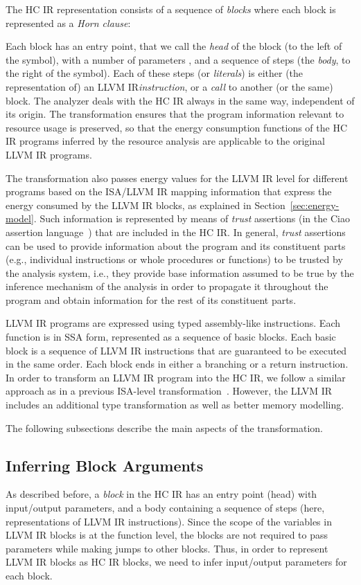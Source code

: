 \documentclass{llncs}
\newcommand{\level}{level\xspace}
\newcommand{\hcir}{HC IR\xspace}
\newcommand{\llvmir}{LLVM IR\xspace}
\newcommand{\ciao}{Ciao\xspace}
\begin{document}
The \hcir representation consists of a sequence of \emph{blocks} where
each block is represented as a \emph{Horn clause}:

\centerline{\mbox{}}

\noindent
Each block has an entry point, that we call the \emph{head} of the
block (to the left of the  symbol),
with a number of parameters , and a sequence of steps (the
\emph{body}, to the right of the  symbol). Each of these 
steps (or \emph{literals}) is either (the representation of) an
\llvmir \emph{instruction}, or a \emph{call} to another (or the same)
block.
The analyzer deals with the \hcir always in the same way, independent
of its origin.
The transformation ensures that the program information relevant to
resource usage is preserved, so that the energy consumption functions
of the \hcir programs inferred by the resource analysis are applicable
to the original \llvmir programs.

The transformation also 
passes energy values for the
\llvmir \level for different programs based on the ISA/\llvmir mapping
information that express the energy consumed by the \llvmir blocks, as
explained in Section~\ref{sec:energy-model}. Such information is
represented by means of \emph{trust} assertions (in the \ciao
assertion language~\cite{hermenegildo11:ciao-design-tplp-short}) that
are included in the \hcir.
In general, \emph{trust} assertions can be used to provide information
about the program and its constituent parts (e.g., individual
instructions or whole procedures or functions) to be trusted by the
analysis system, i.e., they provide base information assumed to be
true by the inference mechanism of the analysis in order to propagate
it throughout the program and obtain information for the rest of its
constituent parts.

\llvmir programs are expressed using typed assembly-like
instructions. Each function is in SSA form, represented as a sequence
of basic blocks. Each basic block is a sequence of \llvmir
instructions that are guaranteed to be executed in the same order.
Each block ends in either a branching or a 
return instruction. 
In order to transform an \llvmir program into the \hcir, 
we follow a similar approach as in a 
previous
ISA-\level transformation~\cite{isa-energy-lopstr13-final}. 
However, the \llvmir includes an additional type transformation as
well as better memory modelling. 

The following subsections describe the main aspects of the transformation. 
\subsection{Inferring Block Arguments} 
As described before, a \textit{block} in the \hcir has an entry point
(head) with input/output parameters, and a body containing a sequence
of steps
(here, representations of \llvmir instructions). 
Since the scope of the variables in \llvmir blocks is at the function
level, the blocks are not required to pass parameters while making
jumps to other blocks. Thus, in order to represent \llvmir blocks as
\hcir blocks, we need to infer input/output parameters for each block.
\end{document}
